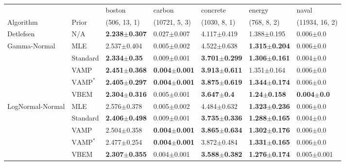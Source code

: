 \begin{tabular}{lllllll}
\toprule
                 &      &                    boston &                    carbon &                  concrete &                    energy &                   naval \\
Algorithm & Prior& (506, 13, 1)& (10721, 5, 3)& (1030, 8, 1)& (768, 8, 2)& (11934, 16, 2)\\
\midrule
Detlefsen & N/A &  \textbf{2.238$\pm$0.307} &           0.027$\pm$0.007 &           4.117$\pm$0.419 &           1.388$\pm$0.195 &           0.006$\pm$0.0 \\
Gamma-Normal & MLE &           2.537$\pm$0.404 &           0.005$\pm$0.002 &           4.522$\pm$0.638 &  \textbf{1.315$\pm$0.204} &           0.006$\pm$0.0 \\
                 & Standard &   \textbf{2.334$\pm$0.35} &           0.009$\pm$0.001 &  \textbf{3.701$\pm$0.299} &  \textbf{1.306$\pm$0.161} &           0.004$\pm$0.0 \\
                 & VAMP &  \textbf{2.451$\pm$0.368} &  \textbf{0.004$\pm$0.001} &  \textbf{3.913$\pm$0.611} &           1.351$\pm$0.164 &           0.006$\pm$0.0 \\
                 & $\text{VAMP}^*$ &  \textbf{2.405$\pm$0.297} &  \textbf{0.004$\pm$0.001} &  \textbf{3.875$\pm$0.619} &  \textbf{1.344$\pm$0.174} &           0.006$\pm$0.0 \\
                 & VBEM &  \textbf{2.304$\pm$0.316} &           0.005$\pm$0.001 &    \textbf{3.647$\pm$0.4} &   \textbf{1.24$\pm$0.158} &  \textbf{0.004$\pm$0.0} \\
LogNormal-Normal & MLE &           2.576$\pm$0.378 &           0.005$\pm$0.002 &           4.484$\pm$0.632 &  \textbf{1.323$\pm$0.236} &           0.006$\pm$0.0 \\
                 & Standard &  \textbf{2.406$\pm$0.498} &           0.009$\pm$0.001 &  \textbf{3.735$\pm$0.336} &  \textbf{1.288$\pm$0.165} &           0.004$\pm$0.0 \\
                 & VAMP &           2.504$\pm$0.358 &  \textbf{0.004$\pm$0.001} &  \textbf{3.865$\pm$0.634} &  \textbf{1.302$\pm$0.176} &           0.006$\pm$0.0 \\
                 & $\text{VAMP}^*$ &           2.477$\pm$0.254 &  \textbf{0.004$\pm$0.001} &           3.872$\pm$0.484 &  \textbf{1.331$\pm$0.165} &           0.006$\pm$0.0 \\
                 & VBEM &  \textbf{2.307$\pm$0.355} &           0.004$\pm$0.001 &  \textbf{3.588$\pm$0.382} &  \textbf{1.276$\pm$0.174} &         0.005$\pm$0.001 \\

\end{tabular}
